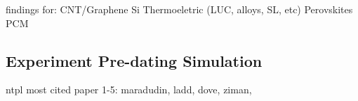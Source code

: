 findings for:
CNT/Graphene
Si
Thermoeletric (LUC, alloys, SL, etc)
Perovskites
PCM

\subsection{Experiment Pre-dating Simulation}

ntpl most cited paper 1-5:
maradudin, ladd, dove, ziman, 

